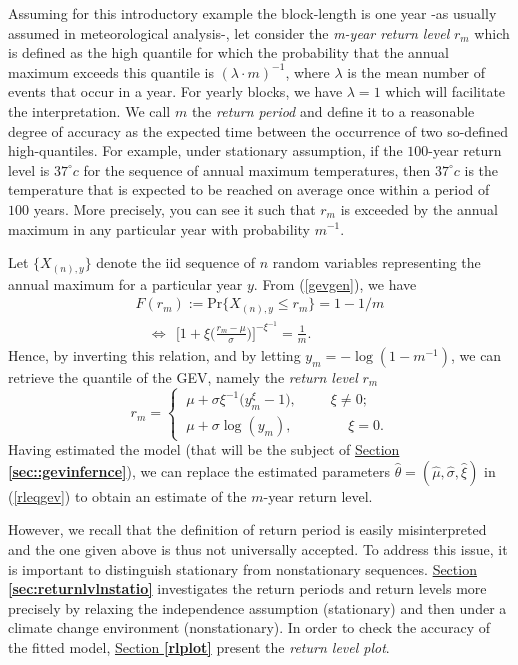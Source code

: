 Assuming for this introductory example the block-length is one year -as usually assumed in meteorological analysis-, let consider the \emph{m-year return level} $r_m$ which is defined as the high quantile for which the probability that the annual maximum exceeds this quantile is $(\lambda\cdot m)^{-1}$, where $\lambda$ is the mean number of events that occur in a year. For yearly blocks, we have $\lambda=1$ which will facilitate the interpretation. We call $m$ the \emph{return period} and define it to a reasonable degree of accuracy as the expected time between the occurrence of two so-defined high-quantiles. For example, under stationary assumption, if the $100$-year return level is $37^{\circ} c$ for the sequence of annual maximum temperatures, then $37^{\circ} c$ is the temperature that is expected to be reached on average once within a period of $100$ years. More precisely, you can see it such that $r_m$ is exceeded by the annual maximum in any particular year with probability $m^{-1}$.

Let $\{X_{(n),y}\}$ denote the iid sequence of $n$ random variables representing the annual maximum for a particular year $y$. From (\ref{gevgen}), we have
\begin{align*}
F(r_m):=\text{Pr}\{X_{(n),y}\leq r_m\}=1-1/m 
\\ \ \ \ \ \Leftrightarrow \ \ \Bigg[1+\xi\bigg(\frac{r_m-\mu}{\sigma}\bigg)\Bigg]^{-\xi^{-1}}=\frac{1}{m}.
\end{align*}
Hence, by inverting this relation, and by letting $y_m=-\log(1-m^{-1})$, we can retrieve the quantile of the GEV, namely the \emph{return level} $r_m$
\begin{equation}\label{rleqgev}
r_m=\begin{cases}
\ \mu+\sigma\xi^{-1}\big(y_m^{\xi}-1\big), \ \ \ \ \ \ \ \  \ \ \  \xi\neq 0;\\
\ \mu +\sigma \log(y_m), \ \ \ \ \ \ \ \ \ \  \ \ \ \ \ \ \ \ \xi =0.
\end{cases}
\end{equation}
Having estimated the model (that will be the subject of \hyperref[sec::gevinfernce]{Section \textbf{\ref{sec::gevinfernce}}}), we can replace the estimated parameters $\hat{\theta}=(\hat{\mu},\hat{\sigma},\hat{\xi})$ in (\ref{rleqgev}) to obtain an estimate of the $m$-year return level.

However, we recall that the definition of return period is easily misinterpreted and the one given above is thus not universally accepted. %
To address this issue, it is important to distinguish stationary from nonstationary sequences.
\hyperref[sec:returnlvlnstatio]{Section \textbf{\ref{sec:returnlvlnstatio}}} investigates the return periods and return levels
more precisely by relaxing the independence assumption (stationary) and then under a climate change environment (nonstationary).
In order to check the accuracy of the fitted model, \hyperref[rlplot]{Section \textbf{\ref{rlplot}}} present the \emph{return level plot}.



